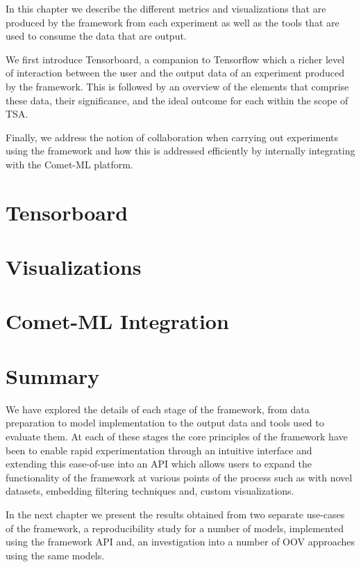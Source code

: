 \documentclass[../../fyp.tex]{subfiles}
\begin{document}
 
In this chapter we describe the different metrics and visualizations that are produced by the framework from each experiment as well as the tools that are used to consume the data that are output. 

We first introduce Tensorboard, a companion to Tensorflow which a richer level of interaction between the user and the output data of an experiment produced by the framework. This is followed by an overview of the elements that comprise these data, their significance, and the ideal outcome for each within the scope of TSA. 

Finally, we address the notion of collaboration when carrying out experiments using the framework and how this is addressed efficiently by internally integrating with the Comet-ML platform.     

\section{Tensorboard}


\section{Visualizations}


\section{Comet-ML Integration}


\section{Summary}
We have explored the details of each stage of the framework, from data preparation to model implementation to the output data and tools used to evaluate them. At each of these stages the core principles of the framework have been to enable rapid experimentation through an intuitive interface and extending this ease-of-use into an API which allows users to expand the functionality of the framework at various points of the process such as with novel datasets, embedding filtering techniques and, custom visualizations.

In the next chapter we present the results obtained from two separate use-cases of the framework, a reproducibility study for a number of models, implemented using the framework API and, an investigation into a number of OOV approaches using the same models.  
\end{document}
